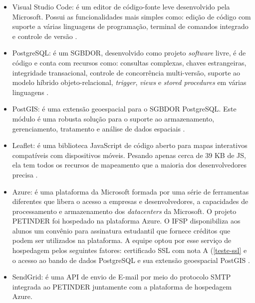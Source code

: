 \begin{itemize}
    \item Visual Studio Code: é um editor de código-fonte leve desenvolvido pela Microsoft. Possui as funcionalidades mais simples como: edição de código com suporte a várias linguagens de programação, terminal de comandos integrado e controle de versão \cite{vscode}.
    
    \item PostgreSQL: é um \ac{SGBDOR}, desenvolvido como projeto \textit{software} livre, é de código e conta com recursos como: consultas complexas, chaves estrangeiras, integridade transacional, controle de concorrência multi-versão, suporte ao modelo híbrido objeto-relacional, \textit{trigger}, \textit{views} e \textit{stored procedures} em várias linguagens \cite{postgresql}.
    
    \item PostGIS: é uma extensão geoespacial para o \ac{SGBDOR} \gls{PostgreSQL}. Este módulo é uma robusta solução para o suporte ao armazenamento, gerenciamento, tratamento e análise de dados espaciais \cite{postgis}.
    
    \item Leaflet: é uma biblioteca JavaScript de código aberto para mapas interativos compatíveis com dispositivos móveis. Pesando apenas cerca de 39 KB de JS, ela tem todos os recursos de mapeamento que a maioria dos desenvolvedores precisa \cite{mapa}.
    
    \item Azure: é uma plataforma da Microsoft formada por uma série de ferramentas diferentes que libera o acesso a empresas e desenvolvedores, a capacidades de processamento e armazenamento dos \textit{datacenters} da Microsoft. O projeto PETINDER foi hospedado na plataforma Azure. O \ac{IFSP} disponibiliza aos alunos um convênio para assinatura estudantil que fornece créditos que podem ser utilizados na plataforma. A equipe optou por esse serviço de hospedagem pelos seguintes fatores: certificado \ac{SSL} com nota A (\autoref{teste-ssl} e o acesso ao bando de dados \gls{PostgreSQL} e sua extensão geoespacial \gls{PostGIS} \cite{azure}.
    
    \item SendGrid: é uma \ac{API} de envio de \gls{E-mail} por meio do protocolo \ac{SMTP} integrada ao PETINDER juntamente com a plataforma de hospedagem Azure.
    
\end{itemize}

